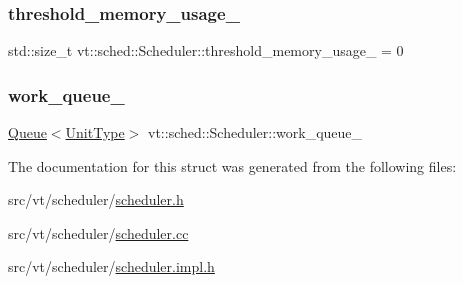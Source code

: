 \subsubsection{\texorpdfstring{threshold\+\_\+memory\+\_\+usage\+\_\+}{threshold\_memory\_usage\_}}
{\footnotesize\ttfamily std\+::size\+\_\+t vt\+::sched\+::\+Scheduler\+::threshold\+\_\+memory\+\_\+usage\+\_\+ = 0\hspace{0.3cm}{\ttfamily [private]}}

\mbox{\label{structvt_1_1sched_1_1_scheduler_a8176bae441897c36b86e3fb917496a7a}} 
\subsubsection{\texorpdfstring{work\+\_\+queue\+\_\+}{work\_queue\_}}
{\footnotesize\ttfamily \hyperlink{structvt_1_1sched_1_1_queue}{Queue}$<$\hyperlink{structvt_1_1sched_1_1_scheduler_a398229f29b0940cea85aba4bae78b0be}{Unit\+Type}$>$ vt\+::sched\+::\+Scheduler\+::work\+\_\+queue\+\_\+\hspace{0.3cm}{\ttfamily [private]}}



The documentation for this struct was generated from the following files\+:\begin{DoxyCompactItemize}
\item 
src/vt/scheduler/\hyperlink{scheduler_8h}{scheduler.\+h}\item 
src/vt/scheduler/\hyperlink{scheduler_8cc}{scheduler.\+cc}\item 
src/vt/scheduler/\hyperlink{scheduler_8impl_8h}{scheduler.\+impl.\+h}\end{DoxyCompactItemize}
